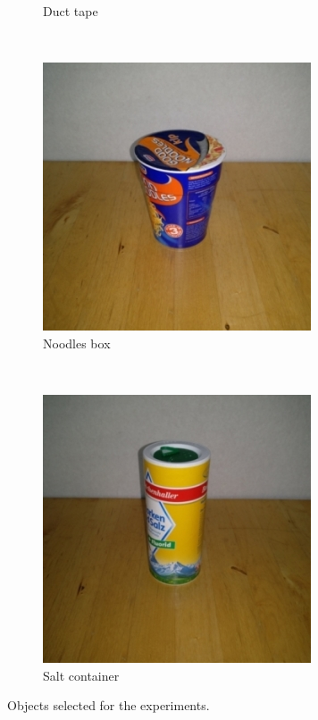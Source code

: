 \documentclass[runningheads]{../llncs}
\begin{document}
\begin{figure}[h!]
\begin{subfigure}[t]{0.23\textwidth}
        \caption{\scriptsize Duct tape}
        \label{fig:object_duct_tape}
    \end{subfigure}
    ~
    \begin{subfigure}[t]{0.23\textwidth}
        \includegraphics[width=\textwidth]{object_noodle_box}
        \caption{\scriptsize Noodles box}
        \label{fig:object_noodle_box}
    \end{subfigure}
    ~
    \begin{subfigure}[t]{0.23\textwidth}
        \includegraphics[width=\textwidth]{object_salt}
        \caption{\scriptsize Salt container}
        \label{fig:object_salt}
    \end{subfigure}
    \caption{Objects selected for the experiments.}\label{fig:objects}
\end{figure}
\end{document}
